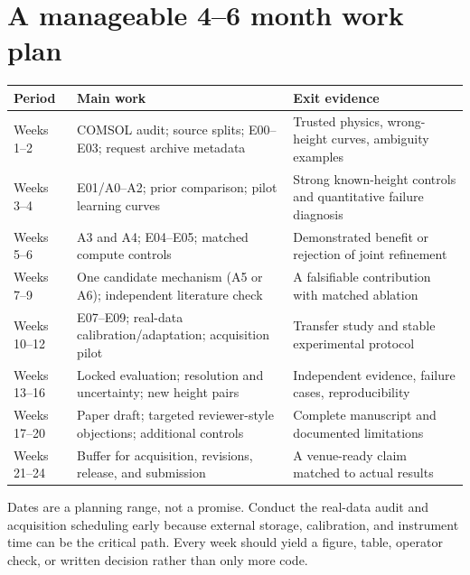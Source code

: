 \section{A manageable 4--6 month work plan}
\label{sec:schedule}
\begin{longtable}{P{23mm}P{65mm}P{63mm}}
\toprule Period & Main work & Exit evidence\\\midrule\endhead
Weeks 1--2 & COMSOL audit; source splits; E00--E03; request archive metadata & Trusted physics, wrong-height curves, ambiguity examples\\
Weeks 3--4 & E01/A0--A2; prior comparison; pilot learning curves & Strong known-height controls and quantitative failure diagnosis\\
Weeks 5--6 & A3 and A4; E04--E05; matched compute controls & Demonstrated benefit or rejection of joint refinement\\
Weeks 7--9 & One candidate mechanism (A5 or A6); independent literature check & A falsifiable contribution with matched ablation\\
Weeks 10--12 & E07--E09; real-data calibration/adaptation; acquisition pilot & Transfer study and stable experimental protocol\\
Weeks 13--16 & Locked evaluation; resolution and uncertainty; new height pairs & Independent evidence, failure cases, reproducibility\\
Weeks 17--20 & Paper draft; targeted reviewer-style objections; additional controls & Complete manuscript and documented limitations\\
Weeks 21--24 & Buffer for acquisition, revisions, release, and submission & A venue-ready claim matched to actual results\\\bottomrule
\end{longtable}
Dates are a planning range, not a promise. Conduct the real-data audit and acquisition scheduling early because external storage, calibration, and instrument time can be the critical path. Every week should yield a figure, table, operator check, or written decision rather than only more code.

